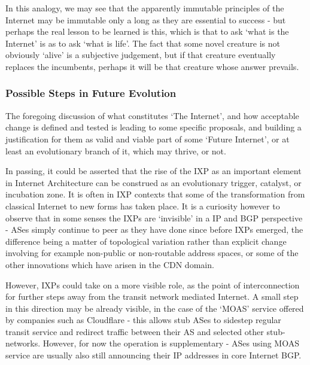 In this analogy, we may see that the apparently immutable principles of the Internet may be immutable only a long as they are essential to success - but perhaps the real lesson to be learned is this, which is that to ask `what is the Internet' is as to ask `what is life'.  The fact that some novel creature is not obviously `alive' is a subjective judgement, but if that creature eventually replaces the incumbents, perhaps it will be that creature whose answer prevails.

\subsubsection{Possible Steps in Future Evolution}
The foregoing discussion of what constitutes `The Internet', and how acceptable change is defined and tested is leading to some specific proposals, and building a justification for them as valid and viable part of some `Future Internet', or at least an evolutionary branch of it, which may thrive, or not.

In passing, it could be asserted that the rise of the IXP as an important element in Internet Architecture can be construed as an evolutionary trigger, catalyst, or incubation zone.  It is often in IXP contexts that some of the transformation from classical Internet to new forms has taken place.  It is a curiosity however to observe that in some senses the IXPs are `invisible' in a IP and BGP perspective - ASes simply continue to peer as they have done since before IXPs emerged, the difference being a matter of topological variation rather than explicit change involving for example non-public or non-routable address spaces, or some of the other innovations which have arisen in the CDN domain.

However, IXPs could take on a more visible role, as the point of interconnection for further steps away from the transit network mediated Internet.  A small step in this direction may be already visible, in the case of the `MOAS' service offered by companies such as Cloudflare - this allows stub ASes to sidestep regular transit service and redirect traffic between their AS and selected other stub-networks.  However, for now the operation is supplementary - ASes using MOAS service are usually also still announcing their IP addresses in core Internet BGP.

